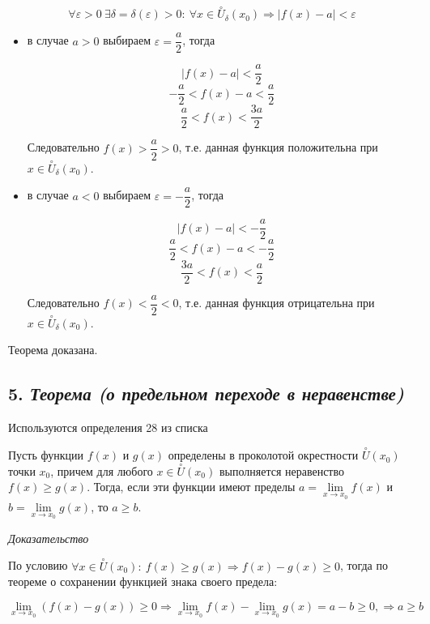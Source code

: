 $$
\forall {\varepsilon} > 0 \ \exists\delta=\delta({\varepsilon} )>0: \ \forall x \in \overset{\circ}U_\delta(x_0) \Rightarrow | f(x) - a|  < {\varepsilon}
$$
\begin{itemize}

\item в случае $a > 0$ выбираем ${\varepsilon} = {\dfrac{a}{2}}$, тогда

$$| f(x) - a|  < {\dfrac{a}{2}}
    $$$$-{\dfrac{a}{2}}< f(x) - a < {\dfrac{a}{2}}
    $$$${\dfrac{a}{2}}< f(x) < {\dfrac{3a}{2}}
    $$

Следовательно $f(x) > {\dfrac{a}{2}}>0$, т.е. данная функция положительна при $x \in \overset{\circ}U_\delta(x_0)$.
\item в случае $a < 0$ выбираем ${\varepsilon} = -{\dfrac{a}{2}}$, тогда

$$| f(x) - a|  < - {\dfrac{a}{2}}
    $$$${\dfrac{a}{2}}< f(x) - a < -{\dfrac{a}{2}}
    $$$${\dfrac{3a}{2}}< f(x) < {\dfrac{a}{2}}
    $$

Следовательно $f(x) < {\dfrac{a}{2}}< 0$, т.е. данная функция отрицательна при $x \in \overset{\circ}U_\delta(x_0)$.

\end{itemize}

Теорема доказана.
\newpage 
\subsection*{5. \textit{Теорема (о предельном переходе в неравенстве)}}
\begin{Quote2} 
\small\centering 

Используются определения 28 из списка \end{Quote2} 

Пусть функции $f(x)$ и $g(x)$ определены в проколотой окрестности $\overset{\circ}U(x_0)$ точки $x_0$, причем для любого $x \in \overset{\circ}U(x_0)$ выполняется неравенство $f(x) \geqslant g(x)$. Тогда, если эти функции имеют пределы $a = \lim\limits_{x \to x_0}f(x)$ и $b = \lim\limits_{x \to x_0}g(x)$, то $a \geqslant b$.
\vspace*{20pt} 

\textit{Доказательство}

По условию $\forall x \in \overset{\circ}U(x_0): \ f(x) \geqslant g(x) \Rightarrow f(x) - g(x) \geqslant 0$, тогда по теореме о сохранении функцией знака своего предела:

$$
\lim\limits_{x \to x_0}(f(x) - g(x)) \geqslant 0 \Rightarrow \lim\limits_{x \to x_0}f(x) - \lim\limits_{x \to x_0}g(x) = a - b \geqslant 0, \Rightarrow a \geqslant b
$$


